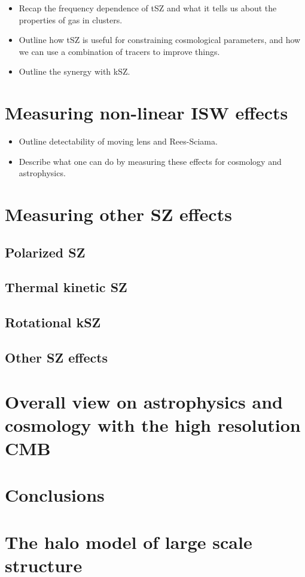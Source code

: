\documentclass[aps,nofootinbib,groupedaddress]{revtex4}
\begin{document}
\begin{itemize}
\item Recap the frequency dependence of tSZ and what it tells us about the properties of gas in clusters.
\item Outline how tSZ is useful for constraining cosmological parameters, and how we can use a combination of tracers to improve things.  
\item Outline the synergy with kSZ.
\end{itemize}


\section{Measuring non-linear ISW effects}

\begin{itemize}
\item Outline detectability of moving lens and Rees-Sciama.
\item Describe what one can do by measuring these effects for cosmology and astrophysics.
\end{itemize}

\section{Measuring other SZ effects}

\subsection{Polarized SZ}

\subsection{Thermal kinetic SZ}

\subsection{Rotational kSZ}

\subsection{Other SZ effects}

\section{Overall view on astrophysics and cosmology with the high resolution CMB }


\section{Conclusions}




\appendix

\section{The halo model of large scale structure}
\end{document}
